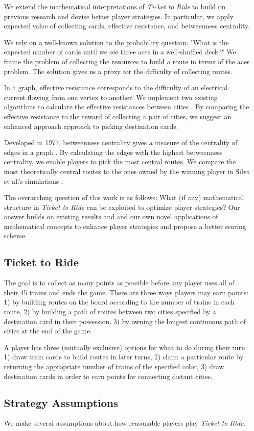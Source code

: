 We extend the mathematical interpretations of
\textit{Ticket to Ride} to build on previous research
and devise better player strategies.
In particular, we apply expected value of collecting cards,
effective resistance, and betweenness centrality.

We rely on a well-known solution to the probability question:
"What is the expected number of cards until
we see three aces in a well-shuffled deck?"
We frame the problem of collecting the resources
to build a route in terms of the aces problem.
The solution gives us a proxy for the difficulty
of collecting routes.

In a graph, effective resistance corresponds
to the difficulty of an electrical current flowing
from one vertex to another.
We implement two existing algorithms to calculate
the effective resistances between cities
\cite{ellens2011effective, wu2004theory}.
By comparing the effective resistance to the reward
of collecting a pair of cities, we suggest an enhanced approach 
approach to picking destination cards.

Developed in 1977, betweenness centrality gives a measure
of the centrality of edges in a graph
\cite{freeman1977set}.
By calculating the edges with the highest betweenness centrality,
we enable players to pick the most central routes.
We compare the most theoretically central routes
to the ones owned by the winning player in Silva et al.'s
simulations \cite{de2017playtesting}.

The overarching question of this work is as follows:
What (if any) mathematical structure in \textit{Ticket to Ride}
can be exploited to optimize player strategies?
Our answer builds on existing results and
and our own novel applications of mathematical concepts to enhance
player strategies and propose a better scoring scheme.

\subsection{Ticket to Ride}
The goal is to collect as many points as possible before
any player uses all of their 45 trains and ends the game.
There are three ways players may earn points:
1) by building routes on the board
according to the number of trains in each route,
2) by building a path of routes
between two cities specified by a destination card in their possession,
3) by owning the longest continuous path of cities at the end of the game.

A player has three (mutually exclusive) options for what to do during
their turn:
1) draw train cards to build routes in later turns,
2) claim a particular route by returning the appropriate
number of trains of the specified color,
3) draw destination cards in order to earn points for connecting
distant cities.
\subsection{Strategy Assumptions}
We make several assumptions about how reasonable players
play \textit{Ticket to Ride}.